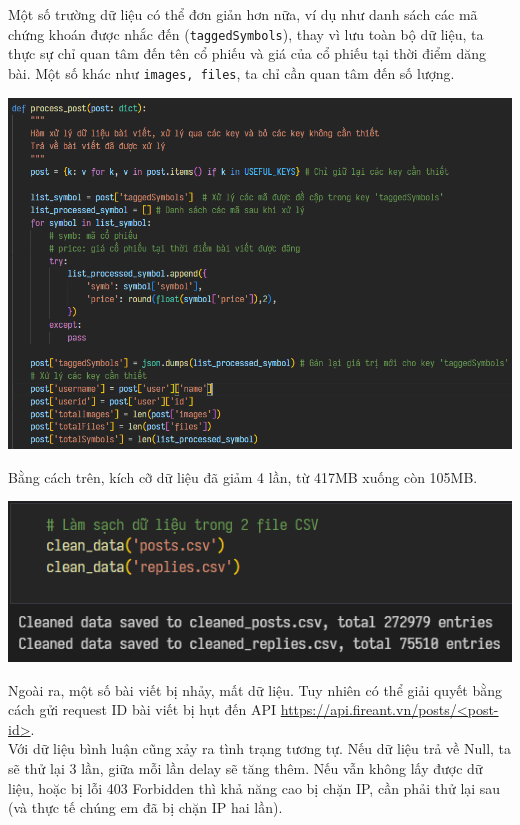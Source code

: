 Một số trường dữ liệu có thể đơn giản hơn nữa, ví dụ như danh sách các mã chứng khoán được nhắc đến (\texttt{taggedSymbols}), thay vì lưu toàn bộ dữ liệu, ta thực sự chỉ quan tâm đến tên cổ phiếu và giá của cổ phiếu tại thời điểm dăng bài. Một số khác như \texttt{images, files}, ta chỉ cần quan tâm đến số lượng.

\begin{center}
    \centering
    \includegraphics[width=0.85\linewidth]{images/code-1.21-filterstep3.png}
\end{center}

Bằng cách trên, kích cỡ dữ liệu đã giảm 4 lần, từ 417MB xuống còn 105MB.

\begin{center}
    \centering
    \includegraphics[width=0.7\linewidth]{images/code-1.22-filterresult.png}
\end{center}

Ngoài ra, một số bài viết bị nhảy, mất dữ liệu. Tuy nhiên có thể giải quyết bằng cách gửi request ID bài viết bị hụt đến API \href{https://api.fireant.vn/posts/<post-id>}{https://api.fireant.vn/posts/<post-id>}.\\

Với dữ liệu bình luận cũng xảy ra tình trạng tương tự. Nếu dữ liệu trả về Null, ta sẽ thử lại 3 lần, giữa mỗi lần delay sẽ tăng thêm. Nếu vẫn không lấy được dữ liệu, hoặc bị lỗi 403 Forbidden thì khả năng cao bị chặn IP, cần phải thử lại sau (và thực tế chúng em đã bị chặn IP hai lần).

